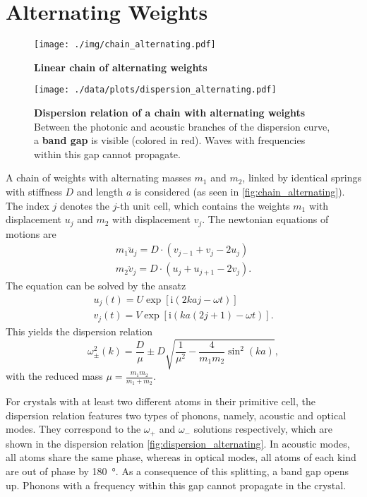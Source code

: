 \section{Alternating Weights}
\begin{figure}[tbp]
	\centering
	\texttt{[image: ./img/chain\_alternating.pdf]}
	\caption[Chain of Alternating Weights]{\textbf{Linear chain of alternating weights}}
	\label{fig:chain_alternating}
\end{figure}
\begin{figure}[tbp]
	\centering
	\texttt{[image: ./data/plots/dispersion\_alternating.pdf]}
	\caption[Dispersion Relation of Chain With Identical Weights]{\textbf{Dispersion relation of a chain with alternating weights} Between the photonic and acoustic branches of the dispersion curve, a \textbf{band gap} is visible (colored in red). Waves with frequencies within this gap cannot propagate.}
	\label{fig:dispersion_alternating}
\end{figure}
A chain of weights with alternating masses $m_1$ and $m_2$, linked by identical springs with stiffness $D$ and length $a$ is considered (as seen in \autoref{fig:chain_alternating}).
The index $j$ denotes the $j$-th unit cell, which contains the weights $m_1$ with displacement $u_j$ and $m_2$ with displacement $v_j$.
The newtonian equations of motions are
\begin{gather*}
	m_1 \ddot u_j = D \cdot \left(v_{j - 1} + v_{j} - 2 u_j \right)\\
	m_2 \ddot v_j = D \cdot \left(u_{j} + u_{j + 1} - 2 v_j \right).
\end{gather*}
The equation can be solved by the ansatz
\begin{gather*}
	u_j(t) = U \exp\left[\text{i} \left(2 k a j - \omega t\right)\right]\\
	v_j(t) = V \exp\left[\text{i} \left(k a (2 j + 1) - \omega t\right)\right].
\end{gather*}
This yields the dispersion relation
\begin{equation}
	\omega_\pm^2(k) = \frac{D}{\mu} \pm D\sqrt{\frac{1}{\mu^2} - \frac{4}{m_1 m_2}\sin^2\left(k a\right)},
\end{equation}
with the reduced mass $\mu = \frac{m_1 m_2}{m_1 + m_2}$.

For crystals with at least two different atoms in their primitive cell, the dispersion relation features two types of phonons, namely, acoustic and optical modes.
They correspond to the $\omega_{+}$ and $\omega_{-}$ solutions respectively, which are shown in the dispersion relation \autoref{fig:dispersion_alternating}.
In acoustic modes, all atoms share the same phase, whereas in optical modes, all atoms of each kind are out of phase by \SI{180}{\degree}.
As a consequence of this splitting, a band gap opens up.
Phonons with a frequency within this gap cannot propagate in the crystal. 
